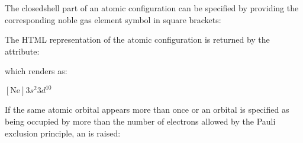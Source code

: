 \documentclass[letterpaper,10pt,english]{sphinxmanual}
\begin{document}
The closed\sphinxhyphen{}shell part of an atomic configuration can be specified by providing the corresponding noble gas element symbol in square brackets:

\begin{sphinxVerbatim}[commandchars=\\\{\}]
 \PYG{p}{[}\PYG{p}{]}    
\end{sphinxVerbatim}

The HTML representation of the atomic configuration is returned by the  attribute:

\begin{sphinxVerbatim}[commandchars=\\\{\}]
 \PYG{p}{[}\PYG{p}{]} 
\PYG{p}{[}\PYG{p}{]}
\end{sphinxVerbatim}

which renders as:



$\mathrm{[Ne]}3s^{2}3d^{10}$

If the same atomic orbital appears more than once or an orbital is specified as being occupied by more than the number of electrons allowed by the Pauli exclusion principle, an  is raised:

\begin{sphinxVerbatim}[commandchars=\\\{\}]
 \PYG{p}{[}\PYG{p}{]}   
    \PYG{p}{[}\PYG{p}{]}

 \PYG{p}{[}\PYG{p}{]}   
       
\end{sphinxVerbatim}
\end{document}
